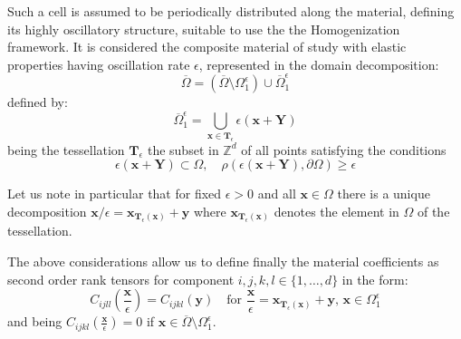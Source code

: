 Such a cell is assumed to be periodically distributed along the material, defining its highly oscillatory structure, suitable to use the the Homogenization framework. It is considered the composite material of study with elastic properties having oscillation rate $\epsilon$, represented in the domain decomposition:
\begin{equation*}
	\overline{\Omega} = (\overline{\Omega}\setminus \Omega_1^{\epsilon}) \cup \overline{\Omega}^{\epsilon}_1
\end{equation*}
defined by:
\begin{equation*}
    \overline{\Omega}^{\epsilon}_1 = \bigcup_{\mathbf{x} \in \mathbf{T}_{\epsilon}} \epsilon ( \mathbf{x} + \mathbf{Y} )
\end{equation*}
being the tessellation $\mathbf{T}_{\epsilon}$ the subset in $\mathbb{Z}^d$ of all points satisfying the conditions
\begin{equation*}
    \epsilon (\mathbf{x} + \mathbf{Y}) \subset \Omega, \quad \rho(\epsilon(\mathbf{x}+\mathbf{Y}), \partial \Omega) \geq \epsilon
\end{equation*}

Let us note in particular that for fixed $\epsilon >0$ and all $\mathbf{x} \in \Omega$ there is a unique decomposition $\mathbf{x}/\epsilon = \mathbf{x}_{\mathbf{T}_{\epsilon}(\mathbf{x})} + \mathbf{y}$ where $\mathbf{x}_{\mathbf{T}_{\epsilon}(\mathbf{x})}$ denotes the element in $\Omega$ of the tessellation.

The above considerations allow us to define finally the material coefficients as second order rank tensors for component $i,j,k,l \in \{1,\dots, d\}$ in the form:
\begin{equation*}
    C_{ijll}(\frac{\mathbf{x}}{\epsilon}) = C_{ijkl}(\mathbf{y}) \quad \text{for } \frac{\mathbf{x}}{\epsilon} = \mathbf{x}_{\mathbf{T}_{\epsilon}(\mathbf{x})} + \mathbf{y}, \, \mathbf{x} \in \Omega_1^{\epsilon}
\end{equation*}
and being $C_{ijkl}(\frac{\mathbf{x}}{\epsilon}) = 0$ if $\mathbf{x} \in \overline{\Omega} \setminus \Omega_1^{\epsilon}$.

